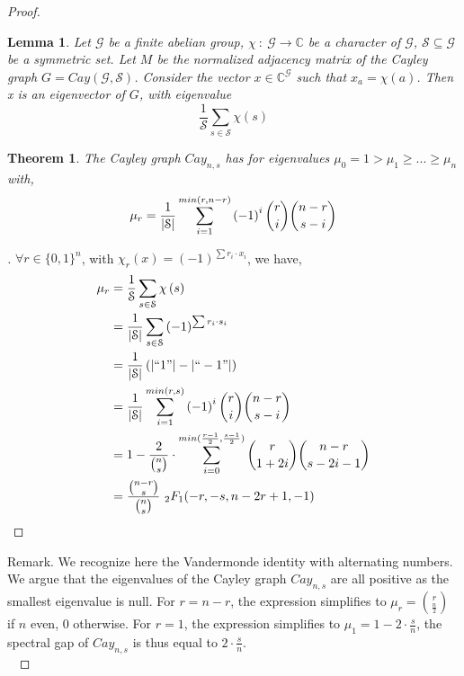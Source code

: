 \documentclass[english,oneside,twocolumn]{article}
\newtheorem{theorem}{Theorem}
\newtheorem{lemma}{Lemma}
\newenvironment{subproof}[1][\proofname]{%
  \renewcommand{\qedsymbol}{$\blacksquare$}%
  \begin{proof}[#1]%
}{%
  \end{proof}%
}
\begin{document}
\begin{proof}
\begin{lemma}
Let $\mathcal{G}$ be a finite abelian group, $\chi\ :\  \mathcal{G} \rightarrow \mathbb{C}$ be a character of $\mathcal{G}$, $\mathcal{S} \subseteq \mathcal{G}$ be a symmetric set.
Let $M$ be the normalized adjacency matrix of the Cayley graph $G = Cay(\mathcal{G},\mathcal{S})$.
Consider the vector $x \in \mathbb{C}^\mathcal{G}$ such that $x_a = \chi(a)$. Then x is an eigenvector of $G$, with eigenvalue $$ \frac{1}{\mathcal{S}} \sum_{s\in \mathcal{S}} \chi\left(s\right)$$
\end{lemma}

\begin{theorem}
The Cayley graph $Cay_{n,s}$ has for eigenvalues $\mu_0 = 1 > \mu_1 \geq ... \geq \mu_n$ with, 
$$\mu_r = \frac{1}{\left | \mathcal{S} \right |} \sum_{i=1}^{min(r, n-r)} \left ( -1 \right )^i {r \choose i}{n-r \choose s-i}\\$$
\end{theorem}

\begin{subproof}
$\forall r \in \{0,1\}^n$, with $\chi_r(x)=\left ( -1 \right )^{\sum r_i \cdot x_i}$, we have,
\begin{align*}
\mu_r &= \frac{1}{\mathcal{S}} \sum_{s\in \mathcal{S}} \chi\left(s\right) \\
&= \frac{1}{\left | \mathcal{S} \right |} \sum_{s\in \mathcal{S}} \left ( -1 \right )^{\sum r_i \cdot s_i} \\
&=  \frac{1}{\left | \mathcal{S} \right |} \left ( \left | ``1" \right | - \left | ``-1"  \right| \right ) \\
&= \frac{1}{\left | \mathcal{S} \right |} \sum_{i=1}^{min(r, s)} \left ( -1 \right )^i {r \choose i}{n-r \choose s-i} \\
&= 1 - \frac{2}{{n \choose s}} \cdot \sum_{i=0}^{min(\frac{r-1}{2}, \frac{s-1}{2})} {r \choose 1+2i}{n-r \choose s-2i-1} \\
&= \frac{{n-r \choose s}}{{n \choose s}} \ _2F_1(-r,-s,n-2r+1,-1)
\end{align*}
\end{subproof}


Remark. We recognize here the Vandermonde identity with alternating numbers. We argue that the eigenvalues of the Cayley graph $Cay_{n,s}$ are all positive as the smallest eigenvalue is null.
For $r=n-r$, the expression simplifies to $\mu_r = {r \choose \frac{n}{2}}$ if $n$ even, 0 otherwise.
For $r=1$, the expression simplifies to $\mu_1 = 1 - 2\cdot \frac{s}{n}$, the spectral gap of $Cay_{n,s}$ is thus equal to $2\cdot \frac{s}{n}$.\\\


\end{proof}
\end{document}
